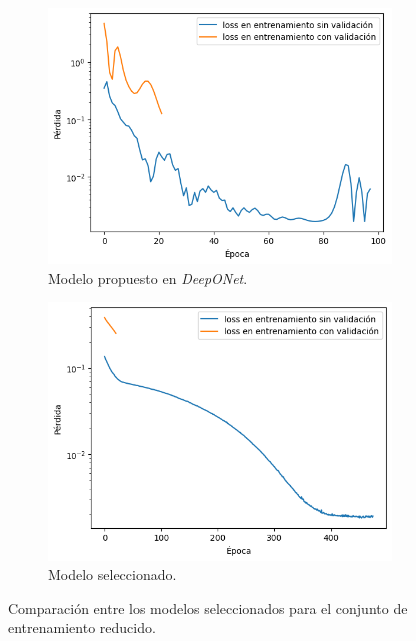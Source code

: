 \begin{figure}[htbp]
    \centering
    \begin{subfigure}{0.45\textwidth}
    \centering
    \includegraphics[width=\linewidth]{img/img62.png} 
    \caption{Modelo propuesto en \textit{DeepONet}.}
    \label{fig:img62}
    \end{subfigure}   
    \begin{subfigure}{0.45\textwidth}
    \centering
    \includegraphics[width=\linewidth]{img/img64.png}
    \caption{Modelo seleccionado.}
    \label{fig:img64}
    \end{subfigure}
\caption{Comparación entre los modelos seleccionados para el conjunto de entrenamiento reducido.}
\label{fig:img6264}
\end{figure}

